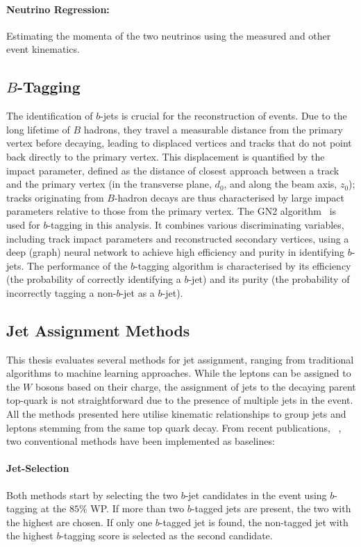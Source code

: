 \paragraph{Neutrino Regression:} Estimating the momenta of the two neutrinos using the measured \met and other event kinematics.

\subsection{$B$-Tagging}
\label{sec:b_tagging}
The identification of $b$-jets is crucial for the reconstruction of \ttbar events. Due to the long lifetime of $B$ hadrons, they travel a measurable distance from the primary vertex before decaying, leading to displaced vertices and tracks that do not point back directly to the primary vertex. This displacement is quantified by the impact parameter, defined as the distance of closest approach between a track and the primary vertex (in the transverse plane, $d_0$, and along the beam axis, $z_0$); tracks originating from $B$-hadron decays are thus characterised by large impact parameters relative to those from the primary vertex. The GN2 algorithm~\cite{gn2_btagger} is used for $b$-tagging in this analysis. It combines various discriminating variables, including track impact parameters and reconstructed secondary vertices, using a deep (graph) neural network to achieve high efficiency and purity in identifying $b$-jets. The performance of the $b$-tagging algorithm is characterised by its efficiency (the probability of correctly identifying a $b$-jet) and its purity (the probability of incorrectly tagging a non-$b$-jet as a $b$-jet).

\subsection{Jet Assignment Methods}
\label{sec:jet_assignment}
This thesis evaluates several methods for jet assignment, ranging from traditional algorithms to machine learning approaches. While the leptons can be assigned to the $W$ bosons based on their charge, the assignment of jets to the decaying parent top-quark is not straightforward due to the presence of multiple jets in the event. All the methods presented here utilise kinematic relationships to group jets and leptons stemming from the same top quark decay.
From recent publications, ~\cite{atlas_entanglement,atlas_toponium}, two conventional methods have been implemented as baselines:

\paragraph{Jet-Selection}
Both methods start by selecting the two $b$-jet candidates in the event using $b$-tagging at the $ 85\%$ WP. If more than two $b$-tagged jets are present, the two with the highest \pt are chosen.
If only one $b$-tagged jet is found, the non-tagged jet with the highest $b$-tagging score is selected as the second candidate.
